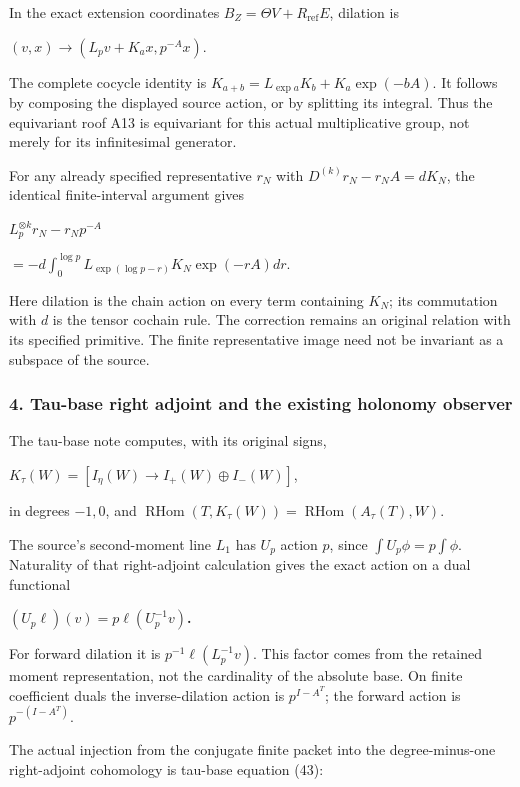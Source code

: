 \documentclass{article}
\begin{document}
In the exact extension coordinates \(B_Z=\Theta V+R_{\mathrm{ref}} E\), dilation is

\((v,x)\to (L_p v+K_a x,p^{-A}x)\).

The complete cocycle identity is \(K_{a+b}=L_{\exp a}K_b+K_a \exp(-bA)\). It follows by composing the displayed source action, or by splitting its integral. Thus the equivariant roof A13 is equivariant for this actual multiplicative group, not merely for its infinitesimal generator.

For any already specified representative \(r_N\) with \(D^{(k)}r_N-r_NA=dK_N\), the identical finite-interval argument gives

\(L_p^{\otimes k}r_N-r_Np^{-A}\)

\(=-d \int_0^{\log p} L_{\exp(\log p-r)} K_N \exp(-rA)dr\).

Here dilation is the chain action on every term containing \(K_N\); its commutation with \(d\) is the tensor cochain rule. The correction remains an original relation with its specified primitive. The finite representative image need not be invariant as a subspace of the source.

\subsubsection{4. Tau-base right adjoint and the existing holonomy observer}\label{endpoint-f1_scaling--tau-base-right-adjoint-and-the-existing-holonomy-observer}

The tau-base note computes, with its original signs,

\(K_\tau(W)=[I_\eta(W) \to  I_+(W) \oplus I_-(W)]\),

in degrees \(-1,0\), and \(\operatorname{RHom}(T,K_\tau(W))=\operatorname{RHom}(A_\tau(T),W)\).

The source's second-moment line \(L_1\) has \(U_p\) action \(p\), since \(\int U_p \phi=p \int \phi\). Naturality of that right-adjoint calculation gives the exact action on a dual functional

\textbf{\((U_p \ell)(v)=p \ell(U_p^{-1}v)\).}

For forward dilation it is \(p^{-1}\ell(L_p^{-1}v)\). This factor comes from the retained moment representation, not the cardinality of the absolute base. On finite coefficient duals the inverse-dilation action is \(p^{I-A^T}\); the forward action is \(p^{-(I-A^T)}\).

The actual injection from the conjugate finite packet into the degree-minus-one right-adjoint cohomology is tau-base equation (43):
\end{document}

